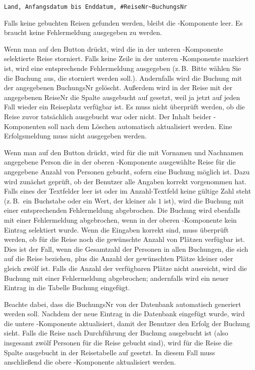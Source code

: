 \begin{compactenum}[a)]
\verb|Land, Anfangsdatum bis Enddatum, #ReiseNr~BuchungsNr|

Falls keine gebuchten Reisen gefunden werden, bleibt die -Komponente leer.
Es braucht keine Fehlermeldung ausgegeben zu werden.

Wenn man auf den Button  drückt, wird die in
der unteren -Komponente selektierte Reise storniert. Falls keine Zeile in
der unteren -Komponente markiert ist, wird eine entsprechende
Fehlermeldung ausgegeben (z.\,B.\ \glqq Bitte wählen Sie die Buchung aus, die storniert
werden soll.\grqq ). Andernfalls wird die Buchung mit der angegebenen BuchungsNr gelöscht.
Außerdem wird in der Reise mit der angegebenen ReiseNr die Spalte ausgebucht
auf  gesetzt, weil ja jetzt auf jeden Fall wieder ein
Reiseplatz verfügbar ist. Es muss nicht überprüft werden, ob die Reise zuvor
tatsächlich ausgebucht war oder nicht. Der Inhalt beider -Komponenten soll
nach dem Löschen automatisch aktualisiert werden. Eine Erfolgsmeldung muss
nicht ausgegeben werden.

Wenn man auf den Button  drückt, wird für die mit
Vornamen und Nachnamen angegebene Person die in der oberen -Komponente
ausgewählte Reise für die angegebene Anzahl von Personen gebucht, sofern eine
Buchung möglich ist. Dazu wird zunächst geprüft, ob der Benutzer alle Angaben
korrekt vorgenommen hat. Falls eines der Textfelder leer ist oder im
Anzahl-Textfeld keine gültige Zahl steht (z.\,B.\ ein Buchstabe oder ein Wert, der
kleiner als $1$ ist), wird die Buchung mit einer entsprechenden Fehlermeldung
abgebrochen. Die Buchung wird ebenfalls mit einer Fehlermeldung abgebrochen,
wenn in der oberen -Komponente kein Eintrag selektiert wurde. Wenn die
Eingaben korrekt sind, muss überprüft werden, ob für die Reise noch die
gewünschte Anzahl von Plätzen verfügbar ist. Dies ist der Fall, wenn die
Gesamtzahl der Personen in allen Buchungen, die sich auf die Reise beziehen,
plus die Anzahl der gewünschten Plätze kleiner oder gleich zwölf ist. Falls die
Anzahl der verfügbaren Plätze nicht ausreicht, wird die Buchung mit einer
Fehlermeldung abgebrochen; andernfalls wird ein neuer Eintrag in die Tabelle
Buchung eingefügt.

Beachte dabei, dass die BuchungsNr von der Datenbank automatisch generiert
werden soll. Nachdem der neue Eintrag in die Datenbank eingefügt wurde, wird
die untere -Komponente aktualisiert, damit der Benutzer den
Erfolg der Buchung sieht. Falls die Reise nach Durchführung der Buchung ausgebucht ist
(also insgesamt zwölf Personen für die Reise gebucht sind), wird für die Reise
die Spalte ausgebucht in der Reisetabelle auf  gesetzt. In diesem Fall muss
anschließend die obere -Komponente aktualisiert werden.
\end{compactenum}

